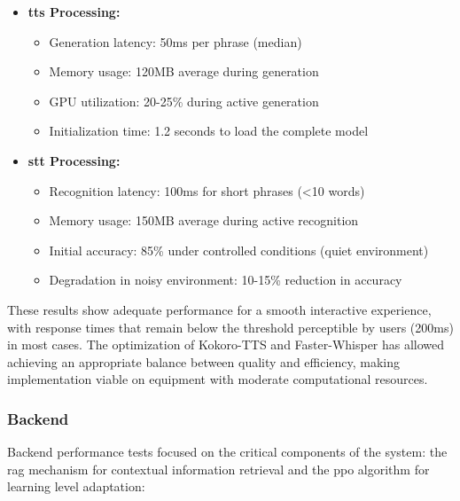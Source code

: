 \begin{itemize}
    \item \textbf{\gls{tts} Processing:}
    \begin{itemize}
        \item Generation latency: 50ms per phrase (median)
        \item Memory usage: 120MB average during generation
        \item GPU utilization: 20-25\% during active generation
        \item Initialization time: 1.2 seconds to load the complete model
    \end{itemize}

    \item \textbf{\gls{stt} Processing:}
    \begin{itemize}
        \item Recognition latency: 100ms for short phrases (<10 words)
        \item Memory usage: 150MB average during active recognition
        \item Initial accuracy: 85\% under controlled conditions (quiet environment)
        \item Degradation in noisy environment: 10-15\% reduction in accuracy
    \end{itemize}
\end{itemize}

These results show adequate performance for a smooth interactive experience, with response times that remain below the threshold perceptible by users (200ms) in most cases. The optimization of Kokoro-TTS and Faster-Whisper has allowed achieving an appropriate balance between quality and efficiency, making implementation viable on equipment with moderate computational resources.

\subsubsection{Backend}
\label{subsubsec:backend-rendimiento}

Backend performance tests focused on the critical components of the system: the \gls{rag} mechanism for contextual information retrieval and the \gls{ppo} algorithm for learning level adaptation:

